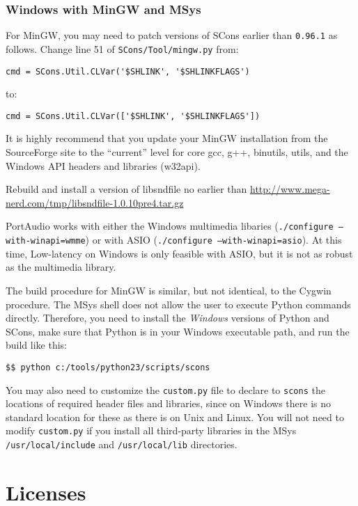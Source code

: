 \documentclass[10pt,letterpaper,onecolumn]{book}
\begin{document}
\subsection{Windows with MinGW and MSys}

For MinGW, you may need to patch versions of SCons earlier than \texttt{0.96.1} as follows. Change line 51 of \texttt{SCons/Tool/mingw.py} from:

\begin{lstlisting}
cmd = SCons.Util.CLVar('$SHLINK', '$SHLINKFLAGS')
\end{lstlisting}
to:
\begin{lstlisting}
cmd = SCons.Util.CLVar(['$SHLINK', '$SHLINKFLAGS']) 
\end{lstlisting}

It is highly recommend that you update your MinGW installation from the SourceForge site to the ``current'' level for core gcc, g++, binutils,  utils, and the Windows API headers and libraries (w32api).

Rebuild and install a version of libsndfile no earlier than \url{http://www.mega-nerd.com/tmp/libsndfile-1.0.10pre4.tar.gz}

PortAudio works with either the Windows multimedia libaries (\texttt{./configure ---with-winapi=wmme}) or with ASIO (\texttt{./configure ---with-winapi=asio}). At this time, Low-latency on Windows is only feasible with ASIO, but it is not as robust as the multimedia library.

The build procedure for MinGW is similar, but not identical, to the Cygwin procedure. The MSys shell does not allow the user to execute Python commands directly. Therefore, you need to install the \emph{Windows} versions of Python and SCons, make sure that Python is in your Windows executable path, and run the build like this:

\begin{lstlisting}
$$ python c:/tools/python23/scripts/scons
\end{lstlisting}

You may also need to customize the \texttt{custom.py} file to declare to \texttt{scons} the locations of required header files and libraries, since on Windows there is no standard location for these as there is on Unix and Linux. You will not need to modify \texttt{custom.py} if you install all third-party libraries in the MSys \texttt{/usr/local/include} and \texttt{/usr/local/lib} directories.


\chapter{Licenses}
\end{document}
